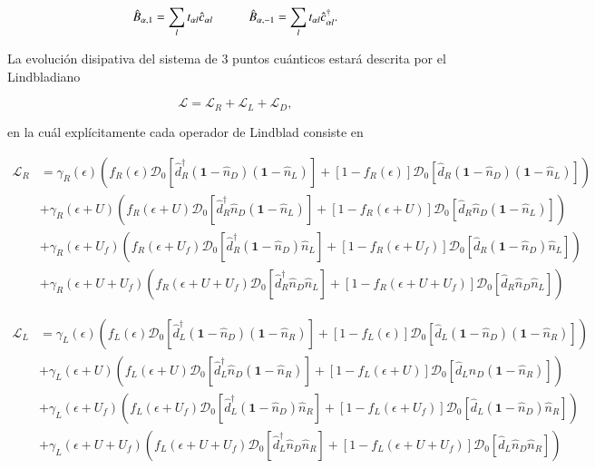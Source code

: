 \begin{equation*}
    \hat{B}_{\alpha,1} = \sum_{l}t_{\alpha l} \hat{c}_{\alpha l} \hspace{10mm} \hat{B}_{\alpha,-1} = \sum_{l}t_{\alpha l} \hat{c}^{\dagger}_{\alpha l}.
\end{equation*}

La evolución disipativa del sistema de 3 puntos cuánticos estará descrita por el Lindbladiano 

\begin{equation}
    \mathcal{L} = \mathcal{L}_{R} + \mathcal{L}_{L} + \mathcal{L}_{D},
    \label{Lindbladsec5}
\end{equation}

en la cuál explícitamente cada operador de Lindblad consiste en

\begin{align*}
    \mathcal{L}_{R} & = \gamma_{R}(\epsilon)(f_{R}(\epsilon)\mathcal{D}_{0}[\hat{d}^{\dagger}_{R}(\textbf{1}-\hat{n}_{D})(\textbf{1}-\hat{n}_{L}) ]  + [1-f_{R}(\epsilon)]\mathcal{D}_{0}[\hat{d}_{R}(\textbf{1}-\hat{n}_{D})(\textbf{1}-\hat{n}_{L}) ]  )  \\
                    & + \gamma_{R}(\epsilon+U)(f_{R}(\epsilon+U)\mathcal{D}_{0}[\hat{d}^{\dagger}_{R}\hat{n}_{D}(\textbf{1}-\hat{n}_{L}) ]  + [1-f_{R}(\epsilon+U)]\mathcal{D}_{0}[\hat{d}_{R}\hat{n}_{D}(\textbf{1}-\hat{n}_{L}) ]  ) \\
                   & + \gamma_{R}(\epsilon+U_{f})(f_{R}(\epsilon+U_{f})\mathcal{D}_{0}[\hat{d}^{\dagger}_{R}(\textbf{1}-\hat{n}_{D})\hat{n}_{L} ]  + [1-f_{R}(\epsilon+U_{f})]\mathcal{D}_{0}[\hat{d}_{R}(\textbf{1}-\hat{n}_{D})\hat{n}_{L} ]  ) \\
                  & + \gamma_{R}(\epsilon+U+U_{f})(f_{R}(\epsilon+U+U_{f})\mathcal{D}_{0}[\hat{d}^{\dagger}_{R}\hat{n}_{D}\hat{n}_{L} ]  + [1-f_{R}(\epsilon+U+U_{f})]\mathcal{D}_{0}[\hat{d}_{R}\hat{n}_{D}\hat{n}_{L} ]  ) 
\end{align*}

\begin{align*}
    \mathcal{L}_{L} & = \gamma_{L}(\epsilon)(f_{L}(\epsilon)\mathcal{D}_{0}[\hat{d}^{\dagger}_{L}(\textbf{1}-\hat{n}_{D})(\textbf{1}-\hat{n}_{R}) ]  + [1-f_{L}(\epsilon)]\mathcal{D}_{0}[\hat{d}_{L}(\textbf{1}-\hat{n}_{D})(\textbf{1}-\hat{n}_{R}) ]  )  \\
                    & + \gamma_{L}(\epsilon+U)(f_{L}(\epsilon+U)\mathcal{D}_{0}[\hat{d}^{\dagger}_{L}\hat{n}_{D}(\textbf{1}-\hat{n}_{R}) ]  + [1-f_{L}(\epsilon+U)]\mathcal{D}_{0}[\hat{d}_{L}\hat{n}_{D}(\textbf{1}-\hat{n}_{R}) ]  ) \\
                   & + \gamma_{L}(\epsilon+U_{f})(f_{L}(\epsilon+U_{f})\mathcal{D}_{0}[\hat{d}^{\dagger}_{L}(\textbf{1}-\hat{n}_{D})\hat{n}_{R} ]  + [1-f_{L}(\epsilon+U_{f})]\mathcal{D}_{0}[\hat{d}_{L}(\textbf{1}-\hat{n}_{D})\hat{n}_{R} ]  ) \\
                  & + \gamma_{L}(\epsilon+U+U_{f})(f_{L}(\epsilon+U+U_{f})\mathcal{D}_{0}[\hat{d}^{\dagger}_{L}\hat{n}_{D}\hat{n}_{R} ]  + [1-f_{L}(\epsilon+U+U_{f})]\mathcal{D}_{0}[\hat{d}_{L}\hat{n}_{D}\hat{n}_{R} ]  ) 
\end{align*}

